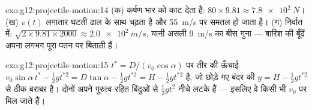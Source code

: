 \begin{solution}{exo:g12:projectile-motion:14}
(क) कर्षण भार को काट देता है: $80 \times 9.81 \approx \qty{7.8e2}{N}$। (ख) $v(t)$ लगातार घटती ढाल के
साथ चढ़ता है और \qty{55}{m/s} पर समतल हो जाता है। (ग) निर्वात में: $\sqrt{2 \times 9.81 \times 2000} \approx \qty{2.0e2}{m/s}$, यानी असली
\qty{9}{m/s} का बीस गुना --- बारिश की बूँदें अपना लगभग पूरा पतन 
पर बिताती हैं।
\end{solution}

\begin{solution}{exo:g12:projectile-motion:15}
$t^* = D/(v_0\cos\alpha)$ पर तीर की ऊँचाई $v_0\sin\alpha\, t^* - \tfrac12 g t^{*2} = D\tan\alpha - \tfrac12 g
t^{*2} = H - \tfrac12 g t^{*2}$ है, जो छोड़े गए बंदर की $y = H - \tfrac12 g t^{*2}$ से ठीक बराबर है।
दोनों अपने गुरुत्व-रहित बिंदुओं से $\tfrac12 gt^2$ नीचे लटके हैं --- इसलिए वे किसी भी
$v_0$ पर मिल जाते हैं।
\end{solution}

